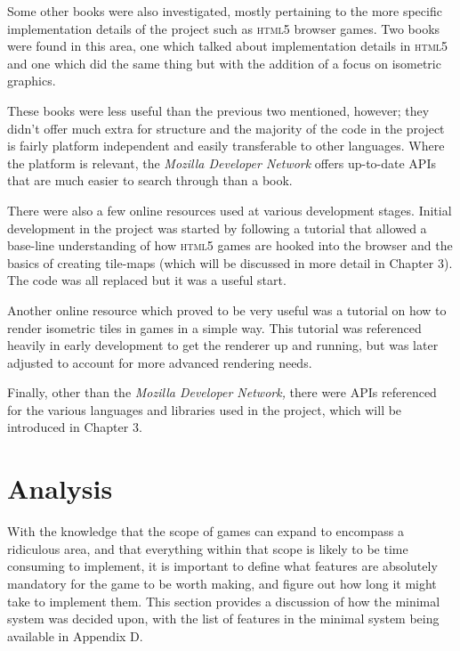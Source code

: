 Some other books were also investigated, mostly pertaining to the more specific implementation details of the project such as \textsc{html5} browser games. Two books were found in this area, one which talked about implementation details in \textsc{html5}\cite{citeulike:13000145} and one which did the same thing but with the addition of a focus on isometric graphics\cite{citeulike:13000170}.

These books were less useful than the previous two mentioned, however; they didn't offer much extra for structure and the majority of the code in the project is fairly platform independent and easily transferable to other languages. Where the platform is relevant, the \textit{Mozilla Developer Network}\cite{citeulike:13151262} offers up-to-date APIs that are much easier to search through than a book.

There were also a few online resources used at various development stages. Initial development in the project was started by following a tutorial\cite{citeulike:13139212} that allowed a base-line understanding of how \textsc{html5} games are hooked into the browser and the basics of creating tile-maps (which will be discussed in more detail in Chapter 3). The code was all replaced but it was a useful start.

Another online resource which proved to be very useful was a tutorial on how to render isometric tiles in games in a simple way\cite{citeulike:13139216}. This tutorial was referenced heavily in early development to get the renderer up and running, but was later adjusted to account for more advanced rendering needs.

Finally, other than the \textit{Mozilla Developer Network,} there were APIs referenced for the various languages and libraries used in the project, which will be introduced in Chapter 3.

\section{Analysis}
With the knowledge that the scope of games can expand to encompass a ridiculous area, and that everything within that scope is likely to be time consuming to implement, it is important to define what features are absolutely mandatory for the game to be worth making, and figure out how long it might take to implement them. This section provides a discussion of how the minimal system was decided upon, with the list of features in the minimal system being available in Appendix D.

